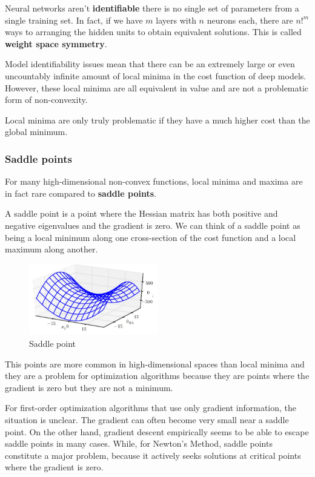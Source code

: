 Neural networks aren't \textbf{identifiable} there is no single set of parameters
from a single training set. In fact, if we have $m$ layers with $n$ neurons each,
there are $n!^m$ ways to arranging the hidden units to obtain equivalent solutions.
This is called \textbf{weight space symmetry}.

Model identifiability issues mean that there can be an extremely large or even
uncountably infinite amount of local minima in the cost function of deep models.
However, these local minima are all equivalent in value and are not a problematic
form of non-convexity.

Local minima are only truly problematic if they have a much higher cost than the
global minimum.
\subsubsection{Saddle points}
For many high-dimensional non-convex functions, local minima and maxima are in
fact rare compared to \textbf{saddle points}.

A saddle point is a point where the Hessian matrix has both positive and negative
eigenvalues and the gradient is zero. We can think of a saddle point as being a
local minimum along one cross-section of the cost function and a local maximum
along another.

\begin{figure}[!ht]
    \centering
    \includegraphics[width=0.5\textwidth]{img/saddle.png}
    \caption{Saddle point}
    \label{fig:saddle}
\end{figure}

This points are more common in high-dimensional spaces than local minima and they
are a problem for optimization algorithms because they are points where the gradient
is zero but they are not a minimum.

For first-order optimization algorithms that use only gradient information, the
situation is unclear. The gradient can often become very small near a saddle point.
On the other hand, gradient descent empirically seems to be able to escape saddle
points in many cases. While, for Newton's Method, saddle points constitute a
major problem, because it actively seeks solutions at critical points where the
gradient is zero.
